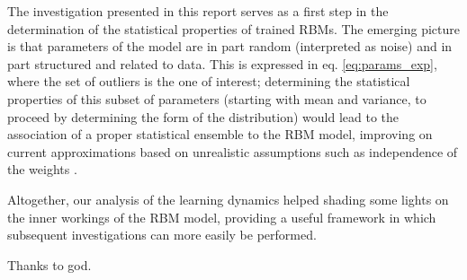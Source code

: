 \documentclass{revtex4-1}
\begin{document}
The investigation presented in this report serves as a first step in the determination of the statistical properties of trained RBMs. The emerging picture is that parameters of the model are in part random (interpreted as noise) and in part structured and related to data. This is expressed in eq. \eqref{eq:params_exp}, where the set of outliers is the one of interest; determining the statistical properties of this subset of parameters (starting with mean and variance, to proceed by determining the form of the distribution) would lead to the association of a proper statistical ensemble to the RBM model, improving on current approximations based on unrealistic assumptions such as independence of the weights \cite{monasson}.

Altogether, our analysis of the learning dynamics helped shading some lights on the inner workings of the RBM model, providing a useful framework in which subsequent investigations can more easily be performed.

\begin{acknowledgements}
Thanks to god.
\end{acknowledgements}


\end{document}

